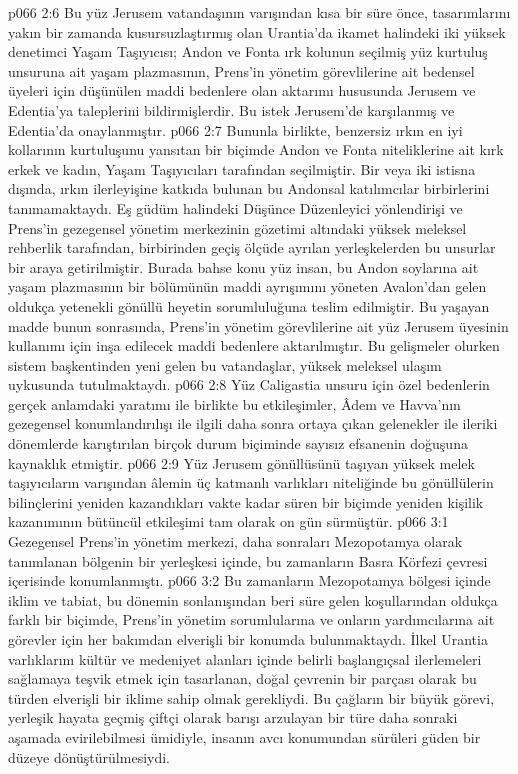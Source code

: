 \vs p066 2:6 Bu yüz Jerusem vatandaşının varışından kısa bir süre önce, tasarımlarını yakın bir zamanda kusursuzlaştırmış olan Urantia’da ikamet halindeki iki yüksek denetimci Yaşam Taşıyıcısı; Andon ve Fonta ırk kolunun seçilmiş yüz kurtuluş unsuruna ait yaşam plazmasının, Prens’in yönetim görevlilerine ait bedensel üyeleri için düşünülen maddi bedenlere olan aktarımı hususunda Jerusem ve Edentia’ya taleplerini bildirmişlerdir. Bu istek Jerusem’de karşılanmış ve Edentia’da onaylanmıştır.
\vs p066 2:7 Bununla birlikte, benzersiz ırkın en iyi kollarının kurtuluşunu yansıtan bir biçimde Andon ve Fonta niteliklerine ait kırk erkek ve kadın, Yaşam Taşıyıcıları tarafından seçilmiştir. Bir veya iki istisna dışında, ırkın ilerleyişine katkıda bulunan bu Andonsal katılımcılar birbirlerini tanımamaktaydı. Eş güdüm halindeki Düşünce Düzenleyici yönlendirişi ve Prens’in gezegensel yönetim merkezinin gözetimi altındaki yüksek meleksel rehberlik tarafından, birbirinden geçiş ölçüde ayrılan yerleşkelerden bu unsurlar bir araya getirilmiştir. Burada bahse konu yüz insan, bu Andon soylarına ait yaşam plazmasının bir bölümünün maddi ayrışımını yöneten Avalon’dan gelen oldukça yetenekli gönüllü heyetin sorumluluğuna teslim edilmiştir. Bu yaşayan madde bunun sonrasında, Prens’in yönetim görevlilerine ait yüz Jerusem üyesinin kullanımı için inşa edilecek maddi bedenlere aktarılmıştır. Bu gelişmeler olurken sistem başkentinden yeni gelen bu vatandaşlar, yüksek meleksel ulaşım uykusunda tutulmaktaydı.
\vs p066 2:8 Yüz Caligastia unsuru için özel bedenlerin gerçek anlamdaki yaratımı ile birlikte bu etkileşimler, Âdem ve Havva’nın gezegensel konumlandırılışı ile ilgili daha sonra ortaya çıkan gelenekler ile ileriki dönemlerde karıştırılan birçok durum biçiminde sayısız efsanenin doğuşuna kaynaklık etmiştir.
\vs p066 2:9 Yüz Jerusem gönüllüsünü taşıyan yüksek melek taşıyıcıların varışından âlemin üç katmanlı varlıkları niteliğinde bu gönüllülerin bilinçlerini yeniden kazandıkları vakte kadar süren bir biçimde yeniden kişilik kazanımının bütüncül etkileşimi tam olarak on gün sürmüştür.
\vs p066 3:1 Gezegensel Prens’in yönetim merkezi, daha sonraları Mezopotamya olarak tanımlanan bölgenin bir yerleşkesi içinde, bu zamanların Basra Körfezi çevresi içerisinde konumlanmıştı.
\vs p066 3:2 Bu zamanların Mezopotamya bölgesi içinde iklim ve tabiat, bu dönemin sonlanışından beri süre gelen koşullarından oldukça farklı bir biçimde, Prens’in yönetim sorumlularına ve onların yardımcılarına ait görevler için her bakımdan elverişli bir konumda bulunmaktaydı. İlkel Urantia varlıklarını kültür ve medeniyet alanları içinde belirli başlangıçsal ilerlemeleri sağlamaya teşvik etmek için tasarlanan, doğal çevrenin bir parçası olarak bu türden elverişli bir iklime sahip olmak gerekliydi. Bu çağların bir büyük görevi, yerleşik hayata geçmiş çiftçi olarak barışı arzulayan bir türe daha sonraki aşamada evirilebilmesi ümidiyle, insanın avcı konumundan sürüleri güden bir düzeye dönüştürülmesiydi.
